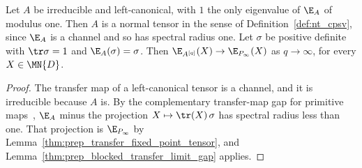 \begin{lemma}
    \label{thm:prep_blocked_transfer_limit_normal}
    \leanok
    Let $A$ be irreducible and left-canonical, with $1$ the only eigenvalue
    of $\E_A$ of modulus one. Then $A$ is a normal tensor in the sense of
    Definition~\ref{def:nt_cpsv}, since $\E_A$ is a channel and so has
    spectral radius one. Let $\sigma$ be positive definite with
    $\tr\sigma=1$ and $\E_A(\sigma)=\sigma$. Then
    $\E_{A^{[q]}}(X)\to\E_{P_\infty}(X)$ as $q\to\infty$, for every
    $X\in\MN{D}$.
\end{lemma}
\begin{proof}
    \leanok
    The transfer map of a left-canonical tensor is a channel, and it is
    irreducible because $A$ is. By the complementary transfer-map gap for
    primitive maps~\cite[``Complementary transfer-map gap for primitive maps'']{QICLean2026Blueprint},
    $\E_A$ minus the projection $X\mapsto\tr(X)\,\sigma$ has spectral radius
    less than one. That projection is $\E_{P_\infty}$ by
    Lemma~\ref{thm:prep_transfer_fixed_point_tensor}, and
    Lemma~\ref{thm:prep_blocked_transfer_limit_gap} applies.
\end{proof}
